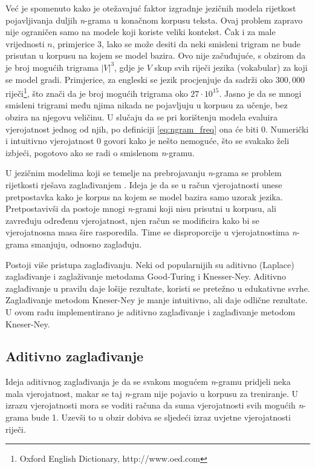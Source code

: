 \documentclass[times, utf8, diplomski, numeric]{fer}
\begin{document}
Već je spomenuto kako je otežavajuć faktor izgradnje jezičnih modela rijetkost pojavljivanja duljih \textit{n}-grama u konačnom korpusu teksta. Ovaj problem zapravo nije ograničen samo na modele koji koriste veliki kontekst. Čak i za male vrijednosti $n$, primjerice 3, lako se može desiti da neki smisleni trigram ne bude prisutan u korpusu na kojem se model bazira. Ovo nije začuđujuće, s obzirom da je broj mogućih trigrama $|V|^3$, gdje je $V$ skup svih riječi jezika (vokabular) za koji se model gradi. Primjerice, za engleski se jezik procjenjuje da sadrži oko $300,000$ riječi\footnote{Oxford English Dictionary, http://www.oed.com}, što znači da je broj mogućih trigrama oko $27 \cdot 10^{15}$. Jasno je da se mnogi smisleni trigrami među njima nikada ne pojavljuju u korpusu za učenje, bez obzira na njegovu veličinu. U slučaju da se pri korištenju modela evaluira vjerojatnost jednog od njih, po definiciji \ref{eq:ngram_freq} ona će biti 0. Numerički i intuitivno vjerojatnost 0 govori kako je nešto nemoguće, što se svakako želi izbjeći, pogotovo ako se radi o smislenom \textit{n}-gramu.

 U jezičnim modelima koji se temelje na prebrojavanju \textit{n}-grama se problem rijetkosti rješava zaglađivanjem . Ideja je da se u račun vjerojatnosti unese pretpostavka kako je korpus na kojem se model bazira samo uzorak jezika. Pretpostavivši da postoje mnogi \textit{n}-grami koji nisu prisutni u korpusu, ali zavređuju određenu vjerojatnost, njen račun se modificira kako bi se vjerojatnosna masa šire rasporedila. Time se disproporcije u vjerojatnostima \textit{n}-grama smanjuju, odnosno zaglađuju.

Postoji više pristupa zaglađivanju. Neki od popularnijih su aditivno (Laplace) zaglađivanje i zaglaživanje metodama Good-Turing i Knesser-Ney. Aditivno zaglađivanje u pravilu daje lošije rezultate, koristi se pretežno u edukativne svrhe. Zaglađivanje metodom Kneser-Ney je manje intuitivno, ali daje odlične rezultate. U ovom radu implementirano je aditivno zaglađivanje i zaglađivanje metodom Kneser-Ney.

\subsection{Aditivno zaglađivanje}

Ideja aditivnog zaglađivanja \cite{Lidstone1920} je da se svakom mogućem \textit{n}-gramu pridjeli neka mala vjerojatnost, makar se taj \textit{n}-gram nije pojavio u korpusu za treniranje. U izrazu vjerojatnosti mora se voditi računa da suma vjerojatnosti svih mogućih \textit{n}-grama bude 1. Uzevši to u obzir dobiva se sljedeći izraz uvjetne vjerojatnosti riječi.
\end{document}
